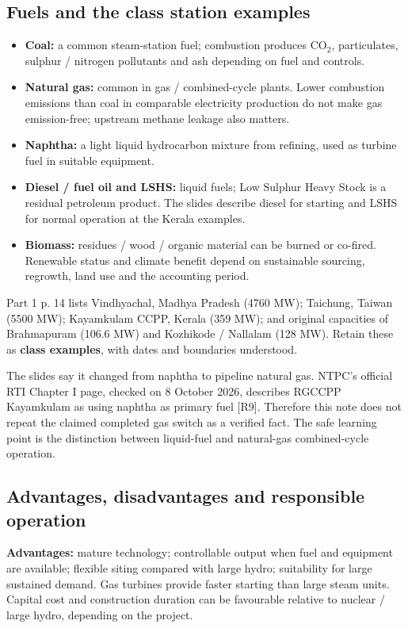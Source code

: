 \documentclass[11pt,a4paper]{article}
\newenvironment{Caution}[1]{\begin{tcolorbox}[colback=warm,colframe=rust,coltitle=white,title={#1}]}{\end{tcolorbox}}
\begin{document}
\subsection{Fuels and the class station examples}
\begin{itemize}
\item \textbf{Coal:} a common steam-station fuel; combustion produces CO$_2$, particulates, sulphur / nitrogen pollutants and ash depending on fuel and controls.
\item \textbf{Natural gas:} common in gas / combined-cycle plants. Lower combustion emissions than coal in comparable electricity production do not make gas emission-free; upstream methane leakage also matters.
\item \textbf{Naphtha:} a light liquid hydrocarbon mixture from refining, used as turbine fuel in suitable equipment.
\item \textbf{Diesel / fuel oil and LSHS:} liquid fuels; Low Sulphur Heavy Stock is a residual petroleum product. The slides describe diesel for starting and LSHS for normal operation at the Kerala examples.
\item \textbf{Biomass:} residues / wood / organic material can be burned or co-fired. Renewable status and climate benefit depend on sustainable sourcing, regrowth, land use and the accounting period.
\end{itemize}
Part 1 p. 14 lists Vindhyachal, Madhya Pradesh (4760 MW); Taichung, Taiwan (5500 MW); Kayamkulam CCPP, Kerala (359 MW); and original capacities of Brahmapuram (106.6 MW) and Kozhikode / Nallalam (128 MW). Retain these as \textbf{class examples}, with dates and boundaries understood.

\begin{Caution}{A factual caution about Kayamkulam}
The slides say it changed from naphtha to pipeline natural gas. NTPC's official RTI Chapter I page, checked on 8 October 2026, describes RGCCPP Kayamkulam as using naphtha as primary fuel [R9]. Therefore this note does not repeat the claimed completed gas switch as a verified fact. The safe learning point is the distinction between liquid-fuel and natural-gas combined-cycle operation.
\end{Caution}

\subsection{Advantages, disadvantages and responsible operation}
\textbf{Advantages:} mature technology; controllable output when fuel and equipment are available; flexible siting compared with large hydro; suitability for large sustained demand. Gas turbines provide faster starting than large steam units. Capital cost and construction duration can be favourable relative to nuclear / large hydro, depending on the project.
\end{document}
